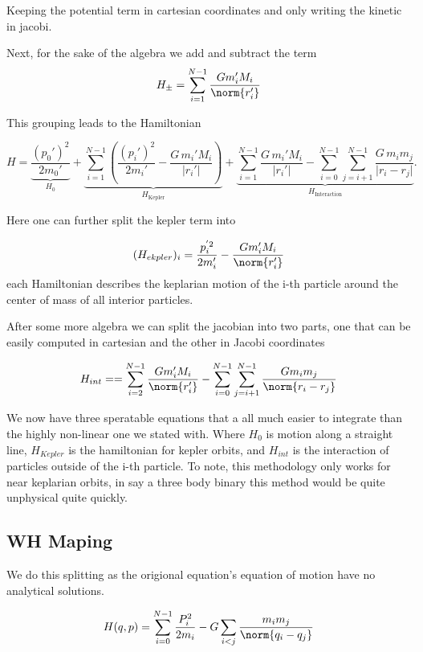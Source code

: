   Keeping the potential term in cartesian coordinates and only writing the kinetic in jacobi.

  Next, for the sake of the algebra we add and subtract the term
\[
H_{\pm} = \sum_{i=1}^{N-1} \frac{G m'_i M_i}{\norm{r'_i}}
  \]

  This grouping leads to the Hamiltonian





\[
H =
\underbrace{\frac{(p_0')^{2}}{2 m_0'}}_{H_0}
+
\underbrace{
\sum_{i=1}^{N-1}
\left(
\frac{(p_i')^{2}}{2 m_i'}
-
\frac{G\, m_i' M_i}{\lvert r_i' \rvert}
\right)
}_{H_{\text{Kepler}}}
+
\underbrace{
\sum_{i=1}^{N-1}
\frac{G\, m_i' M_i}{\lvert r_i' \rvert}
-
\sum_{i=0}^{N-1}
\sum_{j=i+1}^{N-1}
\frac{G\, m_i m_j}{\lvert r_i - r_j \rvert}
}_{H_{\text{Interaction}}}.
\]







Here one can further split the kepler term into

\[
    (H_{ekpler})_i = \frac{p^{'2}_i}{2m'_i} - \frac{Gm'_i M_i}{\norm{r'_i}}
  \]
  each Hamiltonian describes the keplarian motion of the i-th particle around the center of mass of all interior  particles.

  After some more algebra we can split the jacobian into two parts, one that can be easily computed in cartesian and the other in Jacobi coordinates

\[
H_{int} == \sum_{i=2}^{N-1} \frac{Gm'_i M_i}{\norm{r'_i}} - \sum_{i=0}^{N-1} \sum_{j=i+1}^{N-1} \frac{Gm_im_j}{\norm{r_i - r_j}}
  \]

  We now have three speratable equations that a all much easier to integrate than the highly non-linear one we stated with. Where $H_0$ is motion along a straight line, $H_{Kepler}$ is the hamiltonian for kepler orbits, and $H_{int}$ is the interaction of particles outside of the i-th particle. To note, this methodology only works for near keplarian orbits, in say a three body binary this method would be quite unphysical quite quickly.

\subsection{WH Maping}

We do this splitting as the origional equation's equation of motion have no analytical solutions.

\[
H(q,p) = \sum_{i=0}^{N-1}\frac{P^2_i}
{2m_i} - G \sum_{i<j} \frac{m_i m_j}{\norm{q_i - q_j}}
  \]

